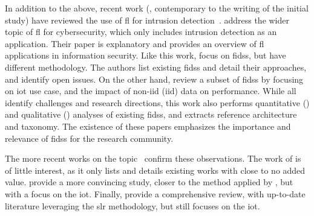 In addition to the above, recent work (\ie, contemporary to the writing of the initial study) have reviewed the use of \gls{fl} for intrusion
detection~\cite{agrawal_FederatedLearningintrusion_2022,campos_EvaluatingFederatedLearning_2022,alazab_FederatedLearningCybersecurity_2021}.
\textcite{alazab_FederatedLearningCybersecurity_2021} address the wider topic of
\gls{fl} for cybersecurity, which only includes intrusion detection as an application.
Their paper
is explanatory and provides an overview of \gls{fl} applications in information security.
Like this
work, \textcite{agrawal_FederatedLearningintrusion_2022} focus on \glspl{fids}, but have different methodology.
The authors list
existing \glspl{fids} and detail their approaches, and identify open issues.
On the other hand,
\textcite{campos_EvaluatingFederatedLearning_2022} review a subset of \glspl{fids} by focusing on \gls{iot} use case, and the
impact of non-\acrshort{iid} (\acrlong{iid}) data on performance.
While all identify challenges and
research directions, this work also performs quantitative () and
qualitative () analyses of existing \glspl{fids}, and extracts reference
architecture and taxonomy.
The existence of these papers emphasizes the importance and relevance of
\glspl{fids} for the research community.

The more recent works on the topic~\cite{fedorchenko_ComparativeReviewIntrusion_2022, ghimire_RecentAdvancesFederated_2022, ismaila_ReviewApproachesFederated_2024} confirm these observations.
The work of \textcite{fedorchenko_ComparativeReviewIntrusion_2022} is of little interest, as it only lists and details existing works with close to no added value.
\textcite{ghimire_RecentAdvancesFederated_2022} provide a more convincing study, closer to the method applied by \textcite{alazab_FederatedLearningCybersecurity_2021}, but with a focus on the \gls{iot}.
Finally, \textcite{ismaila_ReviewApproachesFederated_2024} provide a comprehensive review, with up-to-date literature leveraging the \gls{slr} methodology, but still focuses on the \gls{iot}.
